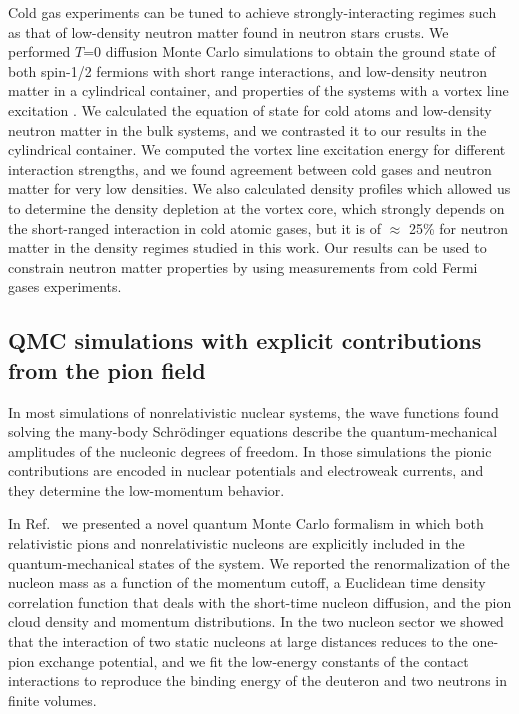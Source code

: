 \documentclass[12pt,letterpaper]{article}
\begin{document}
Cold gas experiments can be tuned to achieve strongly-interacting
regimes such as that of low-density neutron matter found in neutron
stars crusts.
We performed $T$=0 diffusion Monte Carlo simulations
to obtain
the ground state
of both spin-1/2 fermions with short range interactions,
and low-density neutron matter in a 
cylindrical container, and properties
of the systems with a vortex line excitation \cite{madeira19}.
We calculated the equation of state for cold atoms and low-density
neutron matter in the bulk systems, and we contrasted it to
our results in the cylindrical container.
We computed the vortex line excitation energy for different
interaction strengths, and we found agreement between
cold gases and neutron matter
for very low densities.
We also
calculated density profiles which allowed us to determine the
density depletion at the vortex core, which strongly
depends on the short-ranged interaction in cold atomic gases, but it is of $\approx$ 25\% for neutron
matter in the density regimes studied in this work.
Our results can be used to constrain neutron matter properties
by using measurements from cold Fermi gases experiments.

\subsection{QMC simulations with explicit contributions from the pion field}

In most simulations of nonrelativistic nuclear systems, the wave functions found solving
the many-body Schr\"odinger equations describe the quantum-mechanical amplitudes of
the nucleonic degrees of freedom. In those simulations the pionic contributions are
encoded in nuclear potentials and electroweak currents, and they determine
the low-momentum behavior.

In Ref.~\cite{mad18} we presented a novel quantum Monte Carlo formalism in
which both relativistic pions and nonrelativistic nucleons are explicitly included in the quantum-mechanical 
states of the system.
We reported the renormalization of the nucleon mass
as a function of the momentum cutoff, a Euclidean time density
correlation function that deals with the short-time nucleon diffusion, and the pion cloud density and
momentum distributions. In the two nucleon sector we showed that the interaction of two static nucleons
at large distances reduces to the one-pion exchange potential, and we fit the low-energy constants of the
contact interactions to reproduce the binding energy of the deuteron and two neutrons in finite volumes.
\end{document}
